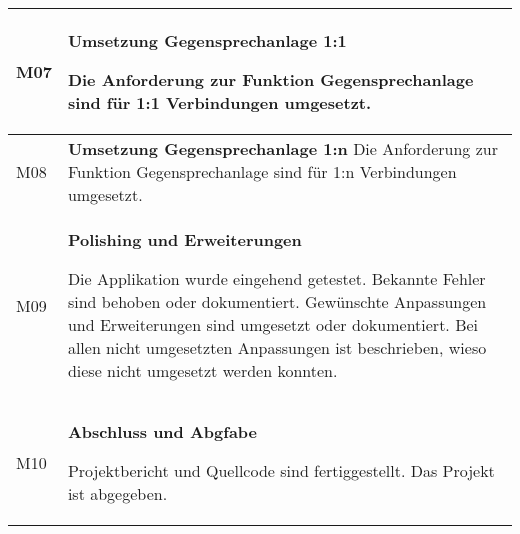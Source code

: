 \begin{table}[h]
\begin{tabular}{|l|p{15cm}|}
        M07         & \textbf{Umsetzung Gegensprechanlage 1:1}

        Die Anforderung zur Funktion Gegensprechanlage sind für 1:1 Verbindungen umgesetzt. \\
        \hline

        M08         & \textbf{Umsetzung Gegensprechanlage 1:n}
        Die Anforderung zur Funktion Gegensprechanlage sind für 1:n Verbindungen umgesetzt. \\
        \hline

        M09         & \textbf{Polishing und Erweiterungen}

        Die Applikation wurde eingehend getestet.
        Bekannte Fehler sind behoben oder dokumentiert.
        Gewünschte Anpassungen und Erweiterungen sind umgesetzt oder dokumentiert.
        Bei allen nicht umgesetzten Anpassungen ist beschrieben, wieso diese nicht umgesetzt werden konnten.
        \\
        \hline

        M10         & \textbf{Abschluss und Abgfabe}

        Projektbericht und Quellcode sind fertiggestellt.
        Das Projekt ist abgegeben.\\
        \hline
    \end{tabular}\label{tab:milestones}
\end{table}

\clearpage
